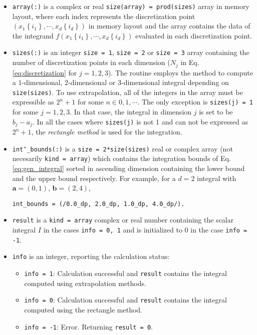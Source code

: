 \documentclass[12pt,a4paper]{article}
\begin{document}
\begin{itemize}
\item {\tt array(:)} is a complex or real {\tt size(array) = prod(sizes)} array in memory layout, where each index represents the discretization point $\left(x_1\left\lbrace i_1\right\rbrace, \cdots, x_d\left\lbrace i_d\right\rbrace \right)$ in memory layout and the array contains the data of the integrand $f\left(x_1\left\lbrace i_1\right\rbrace, \cdots, x_d\left\lbrace i_d\right\rbrace \right)$ evaluated in each discretization point.
\item {\tt sizes(:)} is an integer {\tt size = 1}, {\tt size = 2} or {\tt size = 3} array containing the number of discretization points in each dimension ($N_j$ in Eq. \eqref{eq:discretization} for $j = 1, 2, 3$). The routine employs the method to compute a $1$-dimensional, $2$-dimensional or $3$-dimensional integral depending on {\tt size(sizes)}. To use extrapolation, all of the integers in the array must be expressible as $2^n + 1$ for some $n\in 0, 1,\cdots $. The only exception is {\tt sizes(j) = 1} for some $j = 1, 2, 3$. In that case, the integral in dimension $j$ is set to be $b_j - a_j$. In all the cases where {\tt sizes(j)} is not 1 and can not be expressed as $2^n + 1$, the \textit{rectangle method} \cite{puente-uriona2023} is used for the integration.
\item {\tt int\char`_bounds(:)} is a {\tt size = 2*size(sizes)} real or complex array (not necesarily {\tt kind = array}) which contains the integration bounds of Eq. \eqref{eq:gen_integral} sorted in ascending dimension containing the lower bound and the upper bound respectively. For example, for a $d=2$ integral with $\bm{a} = (0, 1)$, $\bm{b} = (2, 4)$,
\begin{verbatim}
int_bounds = (/0.0_dp, 2.0_dp, 1.0_dp, 4.0_dp/).
\end{verbatim}
\item {\tt result} is a {\tt kind = array} complex or real number containing the scalar integral $I$ in the cases {\tt info = 0, 1} and is initialized to 0 in the case {\tt info = -1}.
\item {\tt info} is an integer, reporting the calculation status:
\begin{itemize}
\item {\tt info = 1}: Calculation successful and {\tt result} contains the integral computed using extrapolation methods.
\item {\tt info = 0}: Calculation successful and {\tt result} contains the integral computed using the rectangle method.
\item {\tt info = -1}: Error. Returning {\tt result = 0}.
\end{itemize}
\end{itemize}
\end{document}
